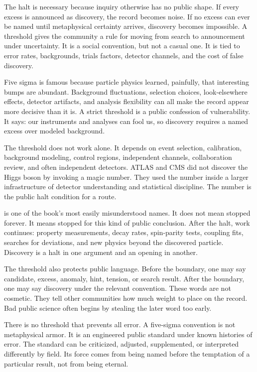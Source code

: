 The halt is necessary because inquiry otherwise has no public shape. If every
excess is announced as discovery, the record becomes noise. If no excess can
ever be named until metaphysical certainty arrives, discovery becomes
impossible. A threshold gives the community a rule for moving from search to
announcement under uncertainty. It is a social convention, but not a casual
one. It is tied to error rates, backgrounds, trials factors, detector
channels, and the cost of false discovery.

Five sigma is famous because particle physics learned, painfully, that
interesting bumps are abundant. Background fluctuations, selection choices,
look-elsewhere effects, detector artifacts, and analysis flexibility can all
make the record appear more decisive than it is. A strict threshold is a
public confession of vulnerability. It says: our instruments and analyses can
fool us, so discovery requires a named excess over modeled background.

The threshold does not work alone. It depends on event selection, calibration,
background modeling, control regions, independent channels, collaboration
review, and often independent detectors. ATLAS and CMS did not discover the
Higgs boson by invoking a magic number. They used the number inside a larger
infrastructure of detector understanding and statistical discipline. The
number is the public halt condition for a route.

 is one of the book's most easily misunderstood names. It does
not mean stopped forever. It means stopped for this kind of
public conclusion. After the halt, work continues: property measurements,
decay rates, spin-parity tests, coupling fits, searches for deviations, and
new physics beyond the discovered particle. Discovery is a halt in one
argument and an opening in another.

The threshold also protects public language. Before the boundary, one may say
candidate, excess, anomaly, hint, tension, or search result. After the
boundary, one may say discovery under the relevant convention. These words are
not cosmetic. They tell other communities how much weight to place on the
record. Bad public science often begins by stealing the later word too early.

There is no threshold that prevents all error. A five-sigma convention is not
metaphysical armor. It is an engineered public standard under known histories
of error. The standard can be criticized, adjusted, supplemented, or
interpreted differently by field. Its force comes from being named before the
temptation of a particular result, not from being eternal.

